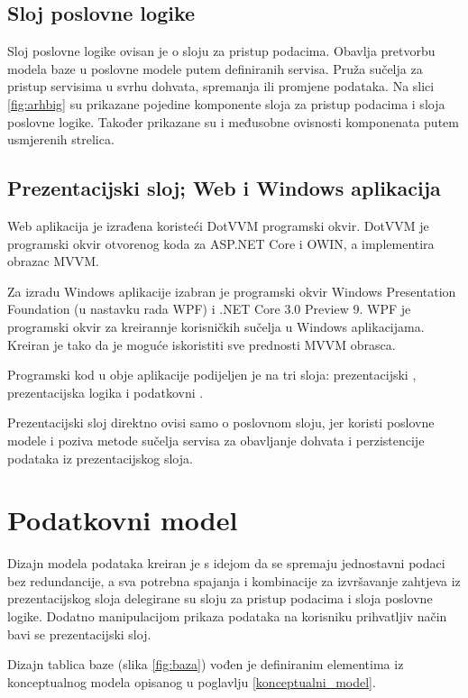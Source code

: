 \documentclass[times, utf8, diplomski]{fer}
\begin{document}
\subsection{Sloj poslovne logike}
Sloj poslovne logike ovisan je o sloju za pristup podacima. Obavlja pretvorbu modela baze u poslovne modele putem definiranih servisa. Pruža sučelja za pristup servisima u svrhu dohvata, spremanja ili promjene podataka.
Na slici \ref{fig:arhbig} su prikazane pojedine komponente sloja za pristup podacima i sloja poslovne logike. Također prikazane su i međusobne ovisnosti komponenata putem usmjerenih strelica.

\subsection{Prezentacijski sloj; Web i Windows aplikacija}
Web aplikacija je izrađena koristeći DotVVM programski okvir.
DotVVM je programski okvir otvorenog koda za ASP.NET Core i OWIN, a implementira obrazac MVVM.

Za izradu Windows aplikacije izabran je programski okvir Windows Presentation Foundation (u nastavku rada WPF) i .NET Core 3.0 Preview 9.
WPF je programski okvir za kreirannje korisničkih sučelja u Windows aplikacijama. Kreiran je tako da je moguće iskoristiti sve prednosti MVVM obrasca.

Programski kod u obje aplikacije podijeljen je na tri sloja: prezentacijski , prezentacijska logika  i podatkovni  .
 
Prezentacijski sloj direktno  ovisi samo o poslovnom sloju, jer koristi poslovne modele i poziva metode sučelja servisa za obavljanje dohvata i perzistencije podataka iz prezentacijskog sloja.


\section{Podatkovni model}
Dizajn modela podataka kreiran je s idejom da se spremaju jednostavni podaci bez redundancije, a sva potrebna spajanja i kombinacije za izvršavanje zahtjeva iz prezentacijskog sloja delegirane su sloju za pristup podacima i sloja poslovne logike. Dodatno manipulacijom prikaza podataka na korisniku prihvatljiv način bavi se prezentacijski sloj.

Dizajn tablica baze (slika \ref{fig:baza}) vođen je definiranim elementima iz konceptualnog modela opisanog u poglavlju \ref{konceptualni_model}.
\end{document}
